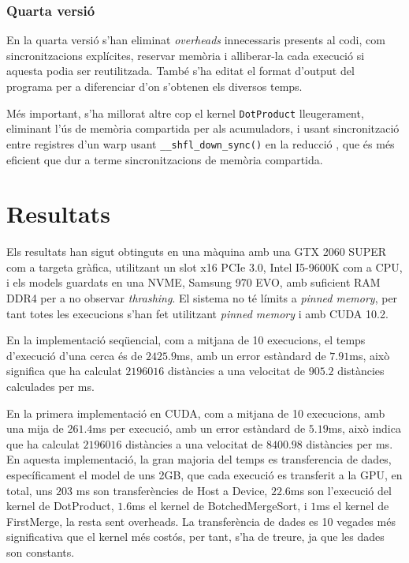 \documentclass[catalan,10pt,a4paper]{article}
\begin{document}
\subsubsection*{Quarta versió}

En la quarta versió s'han eliminat \textit{overheads} innecessaris presents al codi, com sincronitzacions explícites, reservar memòria i alliberar-la cada execució si aquesta podia ser reutilitzada. També s'ha editat el format d'output del programa per a diferenciar d'on s'obtenen els diversos temps.

Més important, s'ha millorat altre cop el kernel \verb|DotProduct| lleugerament, eliminant l'ús de memòria compartida per als acumuladors, i usant sincronització entre registres d'un warp usant \verb|__shfl_down_sync()| en la reducció \cite{UsingCUD95:online}, que és més eficient que dur a terme sincronitzacions de memòria compartida.


\section*{Resultats}\label{sec:results}

Els resultats han sigut obtinguts en una màquina amb una GTX 2060 SUPER com a targeta gràfica, utilitzant un slot x16 PCIe 3.0, Intel I5-9600K com a CPU, i els models guardats en una NVME, Samsung 970 EVO, amb suficient RAM DDR4 per a no observar \textit{thrashing}. El sistema no té límits a \textit{pinned memory}, per tant totes les execucions s'han fet utilitzant \textit{pinned memory} i amb CUDA 10.2.


En la implementació seqüencial, com a mitjana de 10 execucions, el temps d'execució d'una cerca és de $2425.9$ms, amb un error estàndard de $7.91$ms, això significa que ha calculat $2196016$ distàncies a una velocitat de $905.2$ distàncies calculades per ms. 

En la primera implementació en CUDA, com a mitjana de 10 execucions, amb una mija de $261.4$ms per execució, amb un error estàndard de $5.19$ms, això indica que ha calculat $2196016$ distàncies a una velocitat de $8400.98$ distàncies per ms. En aquesta implementació, la gran majoria del temps es transferencia de dades, específicament el model de uns 2GB, que cada execució es transferit a la GPU, en total, uns $203$ ms son transferències de Host a Device, $22.6$ms son l'execució del kernel de DotProduct, $1.6$ms el kernel de BotchedMergeSort, i $1$ms el kernel de FirstMerge, la resta sent overheads. La transferència de dades es 10 vegades més significativa que el kernel més costós, per tant, s'ha de treure, ja que les dades son constants.
\end{document}
